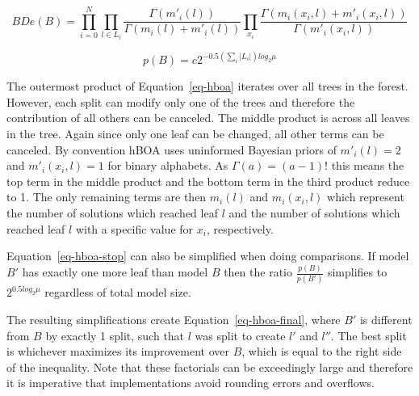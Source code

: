 \documentclass[twoside]{article}
\begin{document}
\begin{equation}
  BDe(B) = \prod_{i=0}^{N}\prod_{l\in L_i} \frac{\Gamma(m'_i(l))}{\Gamma(m_i(l) + m'_i(l))}
  \prod_{x_i}\frac{\Gamma(m_i(x_i, l) + m'_i(x_i,l))}{\Gamma(m'_i(x_i,l))}
  \label{eq-hboa}
\end{equation}

\begin{equation}
  p(B) = c2^{-0.5(\sum_i|L_i|)log_2\mu}
  \label{eq-hboa-stop}
\end{equation}

The outermost product of Equation~\ref{eq-hboa} iterates over all trees in the forest. However, each split
can modify only one of the trees and therefore the contribution of all others can be canceled. The middle
product is across all leaves in the tree. Again since only one leaf can be changed, all other terms can
be canceled. By convention hBOA uses uninformed Bayesian priors of $m'_i(l)= 2$ and $m'_i(x_i, l)=1$ for
binary alphabets. As $\Gamma(a) = (a-1)!$ this means the top term in the middle product and the bottom
term in the third product reduce to 1. The only remaining terms are then $m_i(l)$ and $m_i(x_i, l)$ which
represent the number of solutions which reached leaf $l$ and the number of solutions which reached leaf $l$
with a specific value for $x_i$, respectively.

Equation~\ref{eq-hboa-stop} can also be simplified when doing comparisons. If model $B'$ has exactly one more
leaf than model $B$ then the ratio $\frac{p(B)}{p(B')}$ simplifies to $2^{0.5 log_2\mu}$ regardless of
total model size.

The resulting simplifications create Equation~\ref{eq-hboa-final},
where $B'$ is different from $B$ by exactly 1 split, such that $l$ was split to create $l'$ and $l''$.
The best split is whichever maximizes its improvement over $B$, which is equal to the right side
of the inequality. Note that these factorials can be exceedingly large and
therefore it is imperative that implementations avoid rounding errors and overflows.
\end{document}
